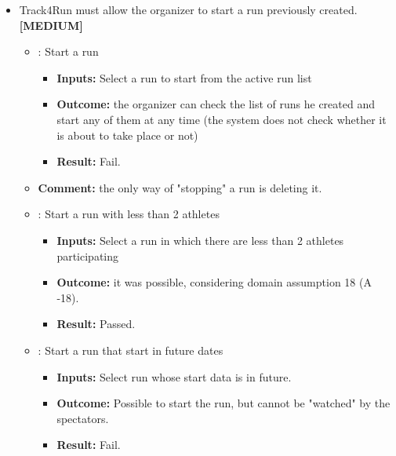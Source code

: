 \documentclass[a4paper, hidelinks, 12pt]{report}
\newcommand\requirement[1]{\item[{[REQ-#1]}] }
\newcommand\test[1]{\item[{[TEST-#1]}] }
\begin{document}
\begin{itemize}
\begin{itemize}
	\end{itemize}
	\requirement{26} Track4Run must allow the organizer to start a run previously created. \textbf{[MEDIUM]}
	\begin{itemize}
	\test{17} : Start a run
				\begin{itemize}
			\item \textbf{Inputs: } Select a run to start from the active run list
			\item \textbf{Outcome: } the organizer can check the list of runs he created and start any of them at any time (the system does not check whether it is about to take place or not)
			\item \textbf{Result: } Fail. 
			\end{itemize}
\item{\textbf{Comment:}} the only way of "stopping" a run is deleting it.

\test{18} : Start a run with less than 2 athletes
				\begin{itemize}
			\item \textbf{Inputs: } Select a run in which there are less than 2 athletes participating
			\item \textbf{Outcome: } it was possible, considering domain assumption 18 (A -18).
			\item \textbf{Result: } Passed. 
			\end{itemize}

\test{19} : Start a run that start in future dates
				\begin{itemize}
			\item \textbf{Inputs: } Select run whose start data is in future. 
			\item \textbf{Outcome: } Possible to start the run, but cannot be "watched" by the spectators.
			\item \textbf{Result: } Fail. 
			\end{itemize}

	\end{itemize}



\end{itemize}
\end{document}
